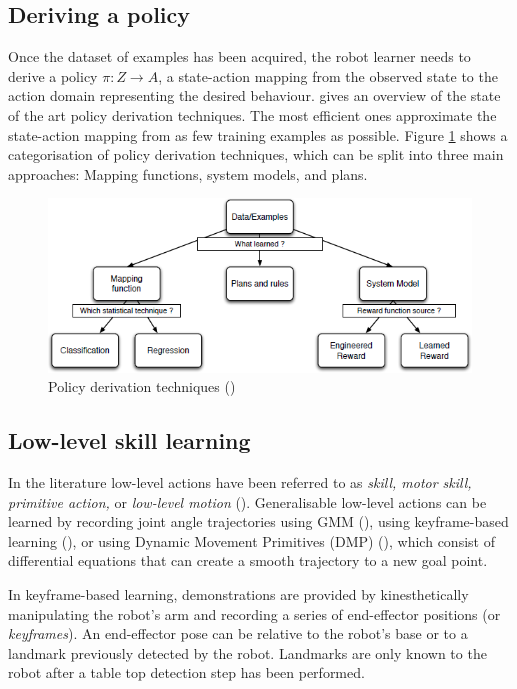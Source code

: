 \subsection{Deriving a policy}\label{subsec:Deriving a policy}
Once the dataset of examples has been acquired, the robot learner needs to derive a policy $\pi : Z \rightarrow A$, a state-action mapping from the observed state to the action domain representing the desired behaviour. 
\cite{chernova2014robot} gives an overview of the state of the art policy derivation techniques.
The most efficient ones approximate the state-action mapping from as few training examples as possible.
Figure \ref{fig:Learning-techniques} shows a categorisation of policy derivation techniques, which can be split into three main approaches: Mapping functions, system models, and plans.

  \begin{figure}[!h]
    \centering
    \includegraphics[scale=0.75]{figures/Learning-techniques}
    \caption{Policy derivation techniques (\cite{argall2009survey})}
    \label{fig:Learning-techniques}
  \end{figure}

\subsection{Low-level skill learning}
In the literature low-level actions have been referred to as \textit{skill, motor skill, primitive action,} or \textit{low-level motion} (\cite{chernova2014robot}).
Generalisable low-level actions can be learned by recording joint angle trajectories using GMM (\cite{billard2008robot}), using keyframe-based learning (\cite{akgun2012keyframe}), or using Dynamic Movement Primitives (DMP) (\cite{pastor2009learning}), which consist of differential equations that can create a smooth trajectory to a new goal point.

In keyframe-based learning, demonstrations are provided by kinesthetically manipulating the robot's arm and recording a series of end-effector positions (or \textit{keyframes}). 
An end-effector pose can be relative to the robot's base or to a landmark previously detected by the robot.
Landmarks are only known to the robot after a table top detection step has been performed.

